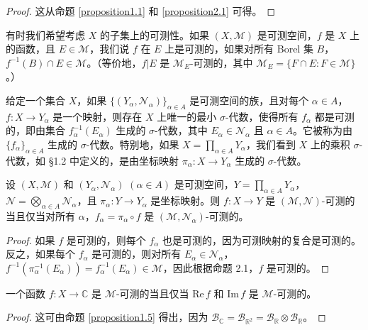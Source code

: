 \documentclass[lang=cn,10pt,thmcnt=section]{elegantbook}
\begin{document}
\begin{proof}
这从命题 \ref{proposition1.1} 和 \ref{proposition2.1} 可得。
\end{proof}

有时我们希望考虑 $X$ 的子集上的可测性。如果 $(X,\mathcal{M})$ 是可测空间，$f$ 是 $X$ 上的函数，且 $E \in \mathcal{M}$，我们说 $f$ 在 $E$ 上是可测的，如果对所有 Borel 集 $B$，$f^{-1}(B) \cap E \in \mathcal{M}$。（等价地，$f|E$ 是 $\mathcal{M}_E$-可测的，其中 $\mathcal{M}_E = \{F \cap E : F \in \mathcal{M}\}$。）

给定一个集合 $X$，如果 $\{(Y_\alpha,\mathcal{N}_\alpha)\}_{\alpha\in A}$ 是可测空间的族，且对每个 $\alpha \in A$，$f : X \to Y_\alpha$ 是一个映射，则存在 $X$ 上唯一的最小 $\sigma$-代数，使得所有 $f_\alpha$ 都是可测的，即由集合 $f_\alpha^{-1}(E_\alpha)$ 生成的 $\sigma$-代数，其中 $E_\alpha \in \mathcal{N}_\alpha$ 且 $\alpha \in A$。它被称为由 $\{f_\alpha\}_{\alpha\in A}$ 生成的 $\sigma$-代数。特别地，如果 $X = \prod_{\alpha\in A} Y_\alpha$，我们看到 $X$ 上的乘积 $\sigma$-代数，如 §1.2 中定义的，是由坐标映射 $\pi_\alpha : X \to Y_\alpha$ 生成的 $\sigma$-代数。

\begin{proposition}\label{proposition2.4}
设 $(X,\mathcal{M})$ 和 $(Y_\alpha,\mathcal{N}_\alpha)$ $(\alpha \in A)$ 是可测空间，$Y = \prod_{\alpha\in A} Y_\alpha$，$\mathcal{N} = \bigotimes_{\alpha\in A} \mathcal{N}_\alpha$，且 $\pi_\alpha : Y \to Y_\alpha$ 是坐标映射。则 $f : X \to Y$ 是 $(\mathcal{M},\mathcal{N})$-可测的当且仅当对所有 $\alpha$，$f_\alpha = \pi_\alpha \circ f$ 是 $(\mathcal{M},\mathcal{N}_\alpha)$-可测的。
\end{proposition}

\begin{proof}
如果 $f$ 是可测的，则每个 $f_\alpha$ 也是可测的，因为可测映射的复合是可测的。反之，如果每个 $f_\alpha$ 是可测的，则对所有 $E_\alpha \in \mathcal{N}_\alpha$，$f^{-1}(\pi_\alpha^{-1}(E_\alpha)) = f_\alpha^{-1}(E_\alpha) \in \mathcal{M}$，因此根据命题 2.1，$f$ 是可测的。
\end{proof}

\begin{corollary}\label{corollary2.5}
一个函数 $f : X \to \mathbb{C}$ 是 $\mathcal{M}$-可测的当且仅当 $\mathrm{Re}\,f$ 和 $\mathrm{Im}\,f$ 是 $\mathcal{M}$-可测的。
\end{corollary}

\begin{proof}
这可由命题 \ref{proposition1.5} 得出，因为 $\mathcal{B}_\mathbb{C} = \mathcal{B}_{\mathbb{R}^2} = \mathcal{B}_\mathbb{R} \otimes \mathcal{B}_\mathbb{R}$。
\end{proof}
\end{document}
